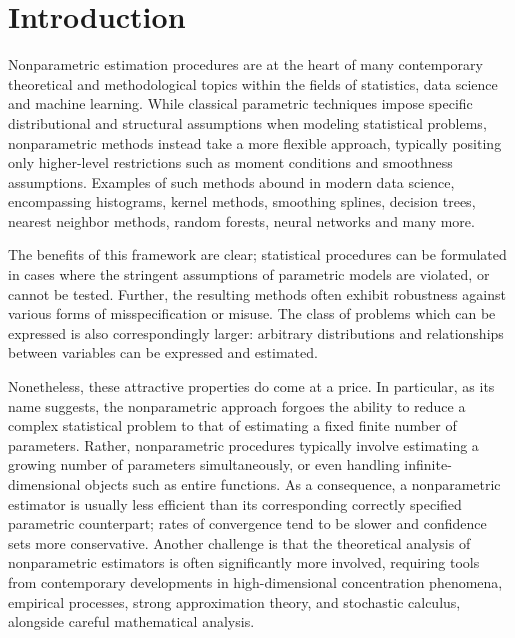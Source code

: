 
\chapter{Introduction}

Nonparametric estimation procedures are at the heart of many
contemporary theoretical and methodological topics within the fields of
statistics, data science and machine learning.
While classical parametric techniques impose specific distributional and
structural assumptions when modeling statistical problems,
nonparametric methods instead take a more flexible approach,
typically positing only higher-level restrictions such as moment conditions
and smoothness assumptions.
Examples of such methods abound in modern data science,
encompassing histograms, kernel methods, smoothing splines, decision trees,
nearest neighbor methods,
random forests, neural networks and many more.

The benefits of this framework are clear; statistical procedures can be
formulated in cases where the stringent assumptions of parametric models
are violated, or cannot be tested. Further, the resulting methods often
exhibit robustness against various forms of misspecification or misuse.
The class of problems which can be expressed is also correspondingly
larger: arbitrary distributions and relationships between variables
can be expressed and estimated.

Nonetheless, these attractive properties do come at a price.
In particular, as its name suggests, the nonparametric approach
forgoes the ability to reduce a complex statistical problem
to that of estimating a fixed finite number of parameters.
Rather, nonparametric procedures typically involve estimating
a growing number of parameters simultaneously,
or even handling infinite-dimensional objects such as entire functions.
As a consequence, a nonparametric estimator is usually less efficient
than its corresponding correctly specified parametric counterpart;
rates of convergence tend to be slower and confidence sets
more conservative. Another challenge
is that the theoretical analysis of nonparametric estimators
is often significantly more involved, requiring tools from
contemporary developments in
high-dimensional concentration phenomena,
empirical processes,
strong approximation theory,
and stochastic calculus,
alongside careful mathematical analysis.

